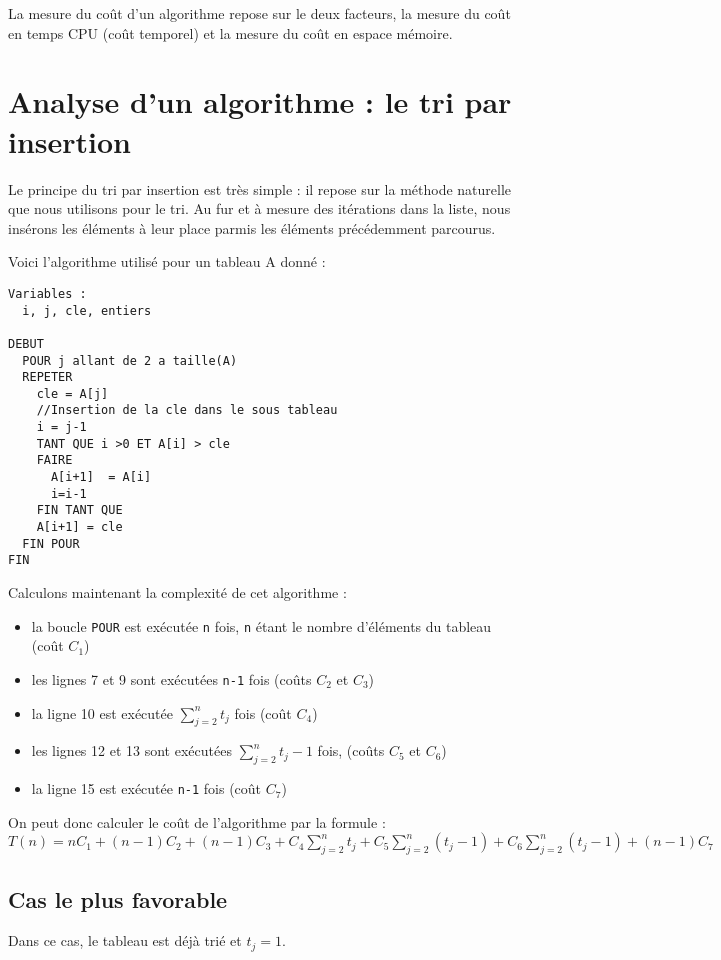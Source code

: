 La mesure du coût d'un algorithme repose sur le deux facteurs, la mesure du
coût en temps CPU (coût temporel) et la mesure du coût en espace mémoire.

\section{Analyse d'un algorithme : le tri par insertion}

Le principe du tri par insertion est très simple : il repose sur la méthode
\og naturelle \fg que nous utilisons pour le tri. Au fur et à mesure des
itérations dans la liste, nous insérons les éléments à leur place parmis les
éléments précédemment parcourus.

Voici l'algorithme utilisé pour un tableau A donné :
\begin{lstlisting}
Variables :
  i, j, cle, entiers

DEBUT
  POUR j allant de 2 a taille(A)
  REPETER
    cle = A[j]
    //Insertion de la cle dans le sous tableau
    i = j-1
    TANT QUE i >0 ET A[i] > cle
    FAIRE
      A[i+1]  = A[i]
      i=i-1
    FIN TANT QUE
    A[i+1] = cle
  FIN POUR
FIN
\end{lstlisting}
Calculons maintenant la complexité de cet algorithme :
\begin{itemize}
  \item la boucle \verb?POUR? est exécutée \verb?n? fois, \verb?n? étant le
nombre d'éléments du tableau (coût $C_1$)
  \item les lignes 7 et 9 sont exécutées \verb?n-1? fois (coûts $C_2$ et
$C_3$)
  \item la ligne 10 est exécutée $\displaystyle{\sum_{j=2}^n}t_j$ fois (coût
$C_4$)
  \item les lignes 12 et 13 sont exécutées $\displaystyle{
\sum_{j=2}^n}t_j-1$ fois, (coûts $C_5$ et $C_6$)
  \item la ligne 15 est exécutée \verb?n-1? fois (coût $C_7$)
\end{itemize}

On peut donc calculer le coût de l'algorithme par la formule :
$T(n) = nC_1 + (n-1)C_2 + (n-1)C_3 + C_4\displaystyle{\sum_{j=2}^n}t_j +
C_5\displaystyle{\sum_{j=2}^n}(t_j-1)  + C_6\displaystyle{\sum_{j=2}^n}(t_j
-1) + (n-1)C_7$

\subsection{Cas le plus favorable}
Dans ce cas, le tableau est déjà trié et $t_j=1$.

